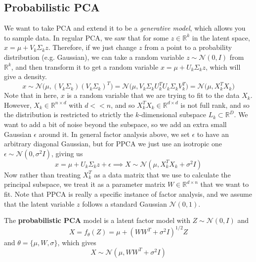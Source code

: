 \subsection{Probabilistic PCA}

  We want to take PCA and extend it to be a \textit{generative model}, which allows you to sample data. In regular PCA, we saw that for some $z \in \mathbb{R}^k$ in the latent space, $\hat{x} = \mu + V_k \Sigma_k z$. Therefore, if we just change $z$ from a point to a probability distribution (e.g. Gaussian), we can take a random variable $z \sim \mathcal{N}(0, I)$ from $\mathbb{R}^k$, and then transform it to get a random variable $x = \mu + U_k \Sigma_k z$, which will give a density. 
  \begin{equation}
    x \sim \mathcal{N} \big( \mu, (V_k \Sigma_k)(V_k \Sigma_k)^T \big) = \mathcal{N} \big( \mu, V_k \Sigma_k U_k^T U_k \Sigma_k V_k^T \big) = \mathcal{N} \big( \mu, X_k^T X_k)
  \end{equation} 
  Note that in here, $x$ is a random variable that we are trying to fit to the data $X_k$. However, $X_k \in \mathbb{R}^{n \times d}$ with $d << n$, and so $X_k^T X_k \in \mathbb{R}^{d \times d}$ is not full rank, and so the distribution is restricted to strictly the $k$-dimensional subspace $L_k \subset \mathbb{R}^D$. We want to add a bit of noise beyond the subspace, so we add an extra small Gaussian $\epsilon$ around it. In general factor analysis above, we set $\epsilon$ to have an arbitrary diagonal Gaussian, but for PPCA we just use an isotropic one $\epsilon \sim \mathcal{N}(0, \sigma^2 I)$, giving us  
  \begin{equation}
    x = \mu + U_k \Sigma_k z + \epsilon \implies X \sim \mathcal{N}(\mu, X_k^T X_k + \sigma^2 I)
  \end{equation} 
  Now rather than treating $X_k^T$ as a data matrix that we use to calculate the principal subspace, we treat it as a parameter matrix $W \in \mathbb{R}^{d \times n}$ that we want to fit. Note that PPCA is really a specific instance of factor analysis, and we assume that the latent variable $z$ follows a standard Gaussian $\mathcal{N}(0, 1)$. 

  \begin{definition} 
    The \textbf{probabilistic PCA} model is a latent factor model with $Z \sim \mathcal{N}(0, I)$ and 
    \begin{equation}
      X = f_\theta (Z) = \mu + (WW^T + \sigma^2 I )^{1/2} Z
    \end{equation}
    and $\theta = \{\mu, W, \sigma\}$, which gives
    \begin{equation}
      X \sim \mathcal{N}(\mu, W W^T + \sigma^2 I) 
    \end{equation} 
  \end{definition} 

